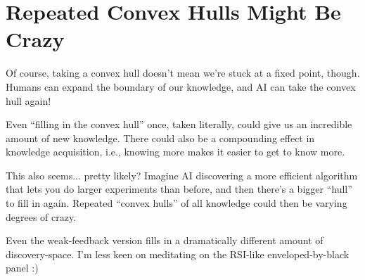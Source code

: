 \documentclass[11pt]{article}
\begin{document}

\section{Repeated Convex Hulls Might Be Crazy}

Of course, taking a convex hull doesn't mean we're stuck at a fixed point, though. Humans can expand the boundary of our knowledge, and AI can take the convex hull again!

Even ``filling in the convex hull'' once, taken literally, could give us an incredible amount of new knowledge.
There could also be a compounding effect in knowledge acquisition, i.e., knowing more makes it easier to get to know more.

This also seems... pretty likely? Imagine AI discovering a more efficient algorithm that lets you do larger experiments than before, and then there's a bigger ``hull'' to fill in again.
Repeated ``convex hulls'' of all knowledge could then be varying degrees of crazy.


Even the weak-feedback version fills in a dramatically different amount of discovery-space. I'm less keen on meditating on the RSI-like enveloped-by-black panel :)
\end{document}

